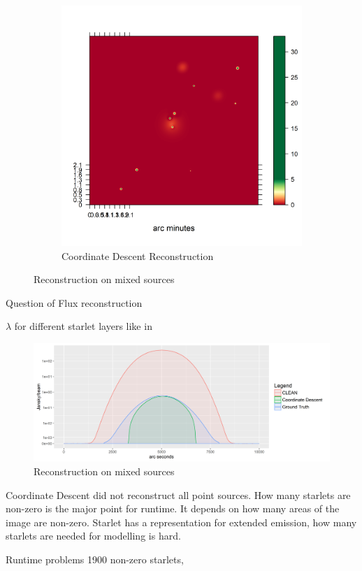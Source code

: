 \begin{figure}[h]
\begin{subfigure}[b]{0.4\linewidth}
		\includegraphics[width=\linewidth, trim={0.2in, 0.2in, 0, 0.2in}, clip]{./chapters/20.results/mixed/mixed_cd.png}
		\caption{Coordinate Descent Reconstruction}
		\label{results:mixed:cd}
	\end{subfigure}
	\caption{Reconstruction on mixed sources}
	\label{results:mixed}
\end{figure}

Question of Flux reconstruction

 $\lambda$ for different starlet layers like in \cite{girard2015sparse}

\begin{figure}[h]
	\centering
	\includegraphics[width=0.8\linewidth]{./chapters/20.results/mixed/mixed_contour.png}
	\caption{Reconstruction on mixed sources}
	\label{results:mixed:contour}
\end{figure}

Coordinate Descent did not reconstruct all point sources. How many starlets are non-zero is the major point for runtime. It depends on how many areas of the image are non-zero. Starlet has a representation for extended emission, how many starlets are needed for modelling is hard.

Runtime problems
1900 non-zero starlets, 


